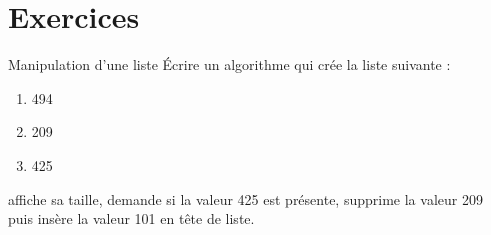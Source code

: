%		
%			
%		
%		
%		
%	
%	
%	
%			
	
	\section{Exercices}
	
		\begin{Exercice}{Manipulation d'une liste}
			Écrire un algorithme qui crée la liste suivante :
			\begin{enumerate}[start=0]
			\item 494
			\item 209
			\item 425
			\end{enumerate}
			affiche sa taille, demande si la valeur 425 est présente, 
			supprime la valeur 209 puis insère la valeur 101 en tête de liste.
		\end{Exercice}
		
